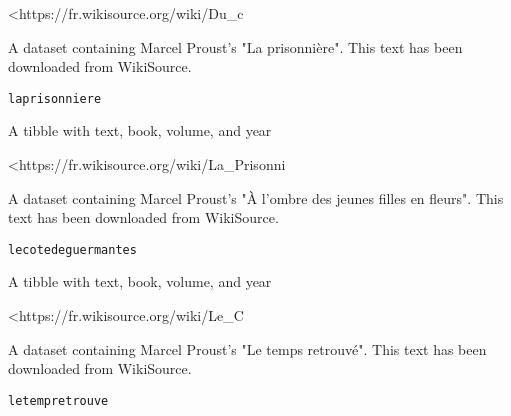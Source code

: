 \documentclass[a4paper]{book}
\begin{document}
%
\begin{Source}\relax
<https://fr.wikisource.org/wiki/Du\_c
\end{Source}
%
\begin{Description}\relax
A dataset containing Marcel Proust's "La prisonnière". 
This text has been downloaded from WikiSource.
\end{Description}
%
\begin{Usage}
\begin{verbatim}
laprisonniere
\end{verbatim}
\end{Usage}
%
\begin{Format}
A tibble with text, book, volume, and year
\end{Format}
%
\begin{Source}\relax
<https://fr.wikisource.org/wiki/La\_Prisonni
\end{Source}
%
\begin{Description}\relax
A dataset containing Marcel Proust's "À l’ombre des jeunes filles en fleurs". 
This text has been downloaded from WikiSource.
\end{Description}
%
\begin{Usage}
\begin{verbatim}
lecotedeguermantes
\end{verbatim}
\end{Usage}
%
\begin{Format}
A tibble with text, book, volume, and year
\end{Format}
%
\begin{Source}\relax
<https://fr.wikisource.org/wiki/Le\_C
\end{Source}
%
\begin{Description}\relax
A dataset containing Marcel Proust's "Le temps retrouvé". 
This text has been downloaded from WikiSource.
\end{Description}
%
\begin{Usage}
\begin{verbatim}
letempretrouve
\end{verbatim}
\end{Usage}
\end{document}
